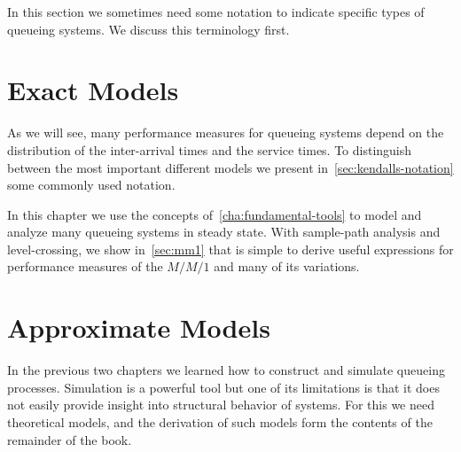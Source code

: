In this section we sometimes need some notation to indicate specific types of queueing systems. We discuss this terminology first.










\chapter{Exact Models}
\label{cha:analytical-models}

As we will see, many performance measures for queueing systems depend on the distribution of the inter-arrival times and the service times. To distinguish between the most important different models we present in~\cref{sec:kendalls-notation} some commonly used notation.

In this chapter we use the concepts of~\cref{cha:fundamental-tools} to model and analyze many queueing systems in steady state.
With sample-path analysis and level-crossing, we show in~\cref{sec:mm1} that is simple to derive useful expressions for performance measures of the $M/M/1$ and many of its variations.








%
%
%



\chapter{Approximate Models}
\label{cha:approximate-models}


In the previous two chapters we learned how to construct and simulate queueing processes.
Simulation is a powerful tool but one of its limitations is that it does not easily provide insight into structural behavior of systems.
For this we need theoretical models, and the derivation of such models form the contents of the remainder of the book.


